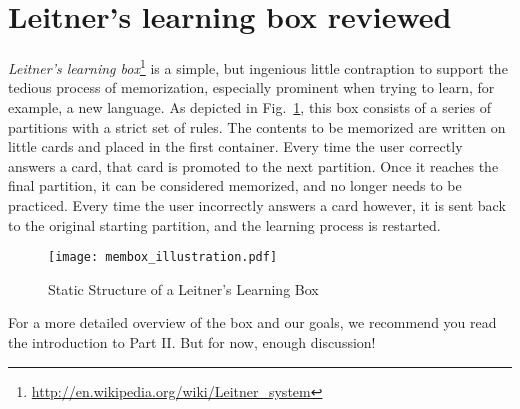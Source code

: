 \section{Leitner's learning box reviewed}

\emph{Leitner's learning box}\footnote{\href{http://en.wikipedia.org/wiki/Leitner\_system}{http://en.wikipedia.org/wiki/Leitner\_system}} is a simple, but
ingenious little contraption to support the tedious process of memorization, especially prominent when trying to learn, for example, a new language. As depicted in
Fig.~\ref{fig:membox_depiction}, this box consists of a series of partitions with a strict set of rules. The contents to be memorized are written on little cards and placed in the first container. Every
time the user correctly answers a card, that card is promoted to the next partition. Once it reaches the final partition, it can be considered memorized, and
no longer needs to be practiced. Every time the user incorrectly answers a card however, it is sent back to the original starting partition, and the
learning process is restarted.

\begin{figure}[htbp]
	\centering
  \texttt{[image: membox\_illustration.pdf]}
	\caption{Static Structure of a Leitner's Learning Box}
	\label{fig:membox_depiction}
\end{figure}

For a more detailed overview of the box and our goals, we recommend you read the introduction to Part II. But for now, enough discussion!

